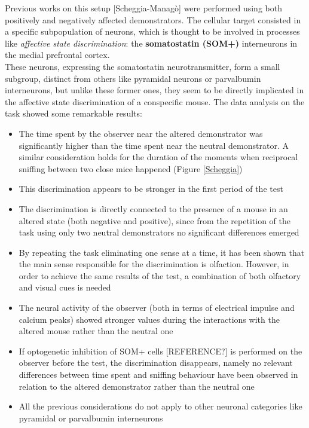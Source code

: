 \documentclass[12pt, a4paper]{article}
\begin{document}
Previous works on this setup [Scheggia-Managò] were performed using both positively and negatively affected demonstrators. The cellular target consisted in a specific subpopulation of neurons, which is thought to be involved in processes like \textit{affective state discrimination}: the \textbf{somatostatin (SOM+)} interneurons in the medial prefrontal cortex.\\
These neurons, expressing the somatostatin neurotransmitter, form a small
subgroup, distinct from others like pyramidal neurons or parvalbumin interneurons, but unlike these former ones, they seem to be directly implicated in the affective state discrimination of a conspecific mouse. The data analysis on the task showed some remarkable results:

 \begin{itemize}
 	
 	\item The time spent by the observer near the altered demonstrator was significantly higher than the time spent near the neutral demonstrator. A similar consideration holds for the duration of the moments when reciprocal sniffing between two close mice happened (Figure \ref{Scheggia})
 	
 	\item This  discrimination appears to be stronger in the first period of the test
 	
 	\item The discrimination is directly connected to the presence of a mouse in an altered state (both negative and positive), since from the repetition of the task using only two neutral demonstrators no significant differences emerged
 	
 	\item By repeating the task eliminating one sense at a time, it has been shown that the main sense responsible for the discrimination is olfaction. However, in order to achieve the same results of the test, a combination of both olfactory and visual cues is needed
 	
 	
 	\item The neural activity of the observer (both in terms of electrical impulse and  calcium peaks) showed stronger values during the interactions with the altered mouse rather than the neutral one
 	
 	\item If optogenetic inhibition of SOM+ cells [REFERENCE?] is
 	performed on the observer before the test, the discrimination disappears, namely no relevant differences between time spent and sniffing behaviour have been observed in relation to the altered demonstrator rather than the neutral one
 	
 	
 	\item All the previous considerations do not apply to other neuronal categories like pyramidal or parvalbumin interneurons
 	 
 \end{itemize}
 
\end{document}
